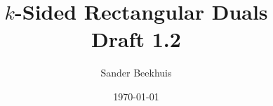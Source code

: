 




%


\title{$k$-Sided Rectangular Duals \\ \normalsize Draft 1.2}
\author{Sander Beekhuis}
\date{\today} %



\maketitle


%



%
%
%
%
%

%


\listoffixmes

%
%
%



